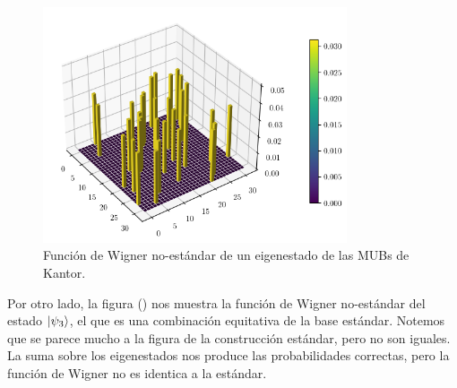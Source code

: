 \documentclass[a4paper]{report}
\begin{document}
  \begin{figure}[ht]
    \centering
    \includegraphics[width=0.8\textwidth]{imgs/wigner-kantor-2-5-s3.png}
    \caption{Función de Wigner no-estándar de un eigenestado
    de las MUBs de Kantor.}
    \label{fig:wigner-kantor-2-5-s3}
  \end{figure}

  Por otro lado, la figura () nos muestra la función de
  Wigner no-estándar del estado
  $\ket{\psi_3}$, el que es una combinación equitativa de la
  base estándar. Notemos que se parece mucho a la figura de
  la construcción estándar, pero no son iguales. La suma
  sobre los eigenestados nos produce las probabilidades
  correctas, pero la función de Wigner no es identica a la
  estándar.
\end{document}
